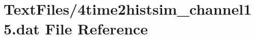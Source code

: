 \hypertarget{4time2histsim__channel15_8dat}{}\section{Text\+Files/4time2histsim\+\_\+channel15.dat File Reference}
\label{4time2histsim__channel15_8dat}
